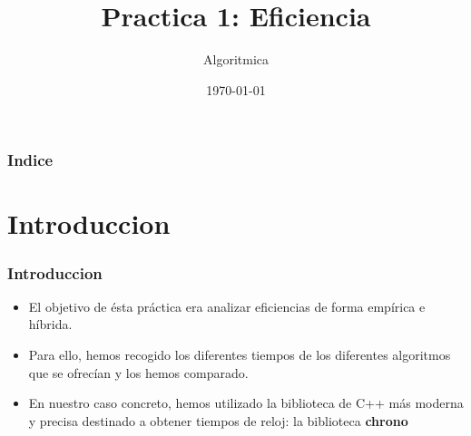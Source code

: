 \documentclass{beamer}
\title[Practica 1]{Practica 1: Eficiencia} %
\author{Algoritmica} %
\institute[UGR] %
{
Universidad de Granada \\ %
\medskip

}
\date{\today} %
\begin{document}
\begin{frame}
\titlepage %
\end{frame}

\begin{frame}
\frametitle{Indice} %
\tableofcontents %
\end{frame}


\section{Introduccion }
\begin{frame}
	\frametitle{Introduccion}
	\begin{itemize}
		\item El objetivo de ésta práctica era analizar eficiencias de forma empírica e híbrida.
		\item Para ello, hemos recogido los diferentes tiempos de los diferentes algoritmos que se ofrecían y los hemos comparado.
		\item En nuestro caso concreto, hemos utilizado la biblioteca de C++ más moderna y precisa destinado a obtener tiempos de reloj: la biblioteca \textbf{chrono}
	
	\end{itemize}
\end{frame}


\end{document}
